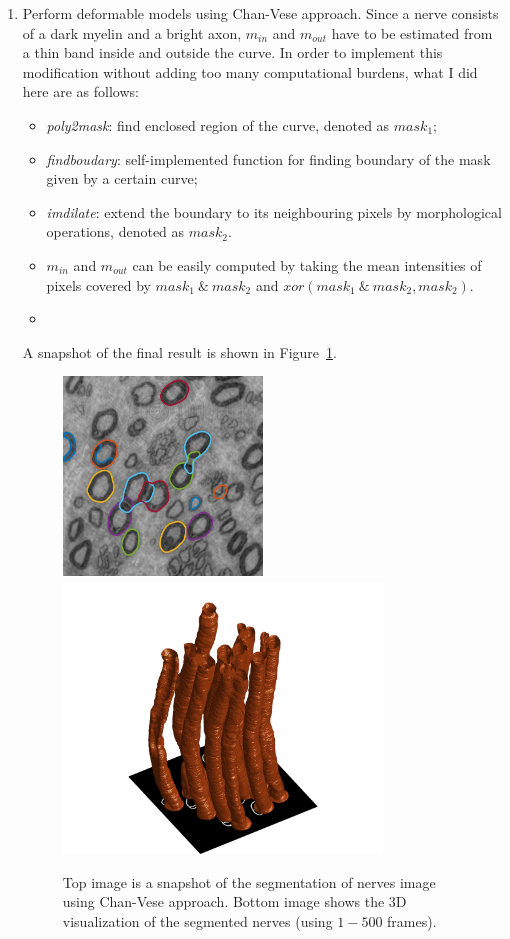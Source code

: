 \documentclass[a4paper]{article}
\begin{document}
\begin{enumerate}
	\item Perform deformable models using Chan-Vese approach. Since a nerve consists of a dark myelin and a bright axon, $m_{in}$ and $m_{out}$ have to be estimated from a thin band inside and outside the curve. In order to implement this modification without adding too many computational burdens, what I did here are as follows:
	\begin{itemize}
	\item \textit{poly2mask}: find enclosed region of the curve, denoted as $mask_1$;
	\item \textit{findboudary}: self-implemented function for finding boundary of the mask given by a certain curve;
	\item \textit{imdilate}: extend the boundary to its neighbouring pixels by morphological operations, denoted as $mask_2$.
	\item $m_{in}$ and $m_{out}$ can be easily computed by taking the mean intensities of pixels covered by $mask_1\ \&\ mask_2$ and $xor(mask_1\ \&\ mask_2, mask_2)$.
	\item 
	\end{itemize}
	A snapshot of the final result is shown in Figure~\ref{final3}.
	\begin{figure}[!b]
	\centering
	\includegraphics[width=0.5\textwidth]{./figures/257.png}
	\includegraphics[width=0.8\textwidth]{./figures/final_res3.png}
	\caption{Top image is a snapshot of the segmentation of nerves image using Chan-Vese approach. Bottom image shows the 3D visualization of the segmented nerves (using $1-500$ frames).}
	\label{final3}
\end{figure}		
	
	\end{enumerate}		
	
\end{document}
